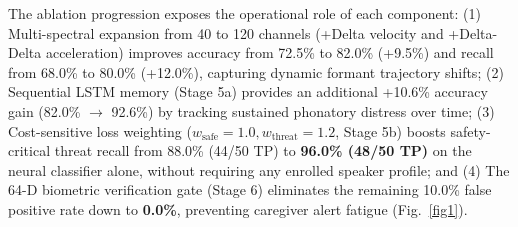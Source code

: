 \documentclass[conference]{IEEEtran}
\begin{document}
\begin{table}[htbp]
\caption{Reconciled Multi-Stage Acoustic Pipeline Ablation Study}
\centering
\renewcommand{\arraystretch}{0.90}
\label{tab3}
\end{table}

The ablation progression exposes the operational role of each component: (1) Multi-spectral expansion from 40 to 120 channels (+Delta velocity and +Delta-Delta acceleration) improves accuracy from 72.5\% to 82.0\% (+9.5\%) and recall from 68.0\% to 80.0\% (+12.0\%), capturing dynamic formant trajectory shifts; (2) Sequential LSTM memory (Stage 5a) provides an additional +10.6\% accuracy gain (82.0\% $\to$ 92.6\%) by tracking sustained phonatory distress over time; (3) Cost-sensitive loss weighting ($w_{\text{safe}}=1.0, w_{\text{threat}}=1.2$, Stage 5b) boosts safety-critical threat recall from 88.0\% (44/50 TP) to \textbf{96.0\% (48/50 TP)} on the neural classifier alone, without requiring any enrolled speaker profile; and (4) The 64-D biometric verification gate (Stage 6) eliminates the remaining 10.0\% false positive rate down to \textbf{0.0\%}, preventing caregiver alert fatigue (Fig.~\ref{fig1}).
\end{document}
